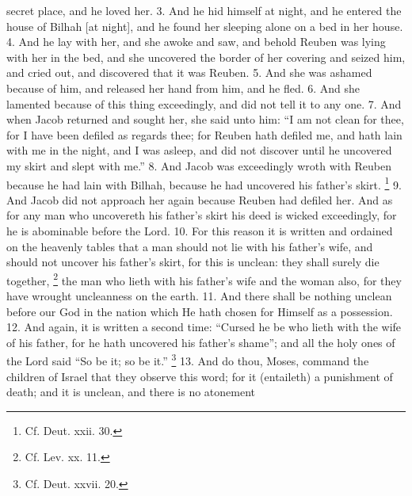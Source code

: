 secret place, and he loved her. 3. And he hid himself at night, and he entered the house of Bilhah [at night], and he found her sleeping alone on a bed in her house. 4. And he lay with her, and she awoke and saw, and behold Reuben was lying with her in the bed, and she uncovered the border of her covering and seized him, and cried out, and discovered that it was Reuben. 5. And she was ashamed because of him, and released her hand from him, and he fled. 6. And she lamented because of this thing exceedingly, and did not tell it to any one. 7. And when Jacob returned and sought her, she said unto him: ``I am not clean for thee, for I have been defiled as regards thee; for Reuben hath defiled me, and hath lain with me in the night, and I was asleep, and did not discover until he uncovered my skirt and slept with me.'' 8. And Jacob was exceedingly wroth with Reuben because he had lain with Bilhah, because he had uncovered his father's skirt. \footnote{Cf. Deut. xxii. 30.} 9. And Jacob did not approach her again because Reuben had defiled her. And as for any man who uncovereth his father's skirt his deed is wicked exceedingly, for he is abominable before the Lord. 10. For this reason it is written and ordained on the heavenly tables that a man should not lie with his father's wife, and should not uncover his father's skirt, for this is unclean: they shall surely die together, \footnote{Cf. Lev. xx. 11.} the man who lieth with his father's wife and the woman also, for they have wrought uncleanness on the earth. 11. And there shall be nothing unclean before our God in the nation which He hath chosen for Himself as a possession. 12. And again, it is written a second time: ``Cursed he be who lieth with the wife of his father, for he hath uncovered his father's shame''; and all the holy ones of the Lord said ``So be it; so be it.'' \footnote{Cf. Deut. xxvii. 20.} 13. And do thou, Moses, command the children of Israel that they observe this word; for it (entaileth) a punishment of death; and it is unclean, and there is no atonement

